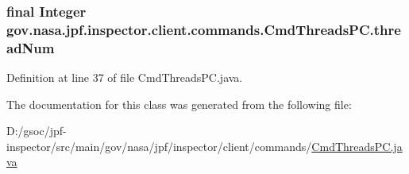 \subsubsection[{\texorpdfstring{thread\+Num}{threadNum}}]{\setlength{\rightskip}{0pt plus 5cm}final Integer gov.\+nasa.\+jpf.\+inspector.\+client.\+commands.\+Cmd\+Threads\+P\+C.\+thread\+Num\hspace{0.3cm}{\ttfamily [private]}}\hypertarget{classgov_1_1nasa_1_1jpf_1_1inspector_1_1client_1_1commands_1_1_cmd_threads_p_c_aea47647fbd31b75c65e90b909429cfa3}{}\label{classgov_1_1nasa_1_1jpf_1_1inspector_1_1client_1_1commands_1_1_cmd_threads_p_c_aea47647fbd31b75c65e90b909429cfa3}


Definition at line 37 of file Cmd\+Threads\+P\+C.\+java.



The documentation for this class was generated from the following file\+:\begin{DoxyCompactItemize}
\item 
D\+:/gsoc/jpf-\/inspector/src/main/gov/nasa/jpf/inspector/client/commands/\hyperlink{_cmd_threads_p_c_8java}{Cmd\+Threads\+P\+C.\+java}\end{DoxyCompactItemize}
